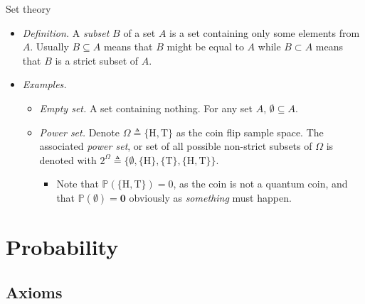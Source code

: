 \documentclass{beamer}
\begin{document}
\begin{frame}{Set theory}
    \begin{itemize}
        \item
        \textit{Definition.} A \textit{subset} $ B $ of a set $ A $ is a set
        containing only some elements from $ A $. Usually $ B \subseteq A $
        means that $ B $ might be equal to $ A $ while $ B \subset A $ means
        that $ B $ is a strict subset of $ A $.

        \item
        \textit{Examples.}
        \begin{itemize}
            \item
            \textit{Empty set.} A set containing nothing. For any set $ A $,
            $ \emptyset \subseteq A $.

            \item
            \textit{Power set.} Denote $ \Omega \triangleq \{\text{H},
            \text{T}\} $ as the coin flip sample space. The associated
            \textit{power set}, or set of all possible non-strict subsets of
            $ \Omega $ is denoted with $ 2^\Omega \triangleq \{\emptyset,
            \{\text{H}\}, \{\text{T}\}, \{\text{H}, \text{T}\}\} $.
            \begin{itemize}
                \item
                Note that $ \mathbb{P}(\{\text{H}, \text{T}\}) = 0 $, as the
                coin is not a quantum coin, and that $ \mathbb{P}(\emptyset)
                = \mathbf{0} $ obviously as \textit{something} must happen.
            \end{itemize}
        \end{itemize}
    \end{itemize}
\end{frame}

\section{Probability}

\subsection{Axioms}
\end{document}
